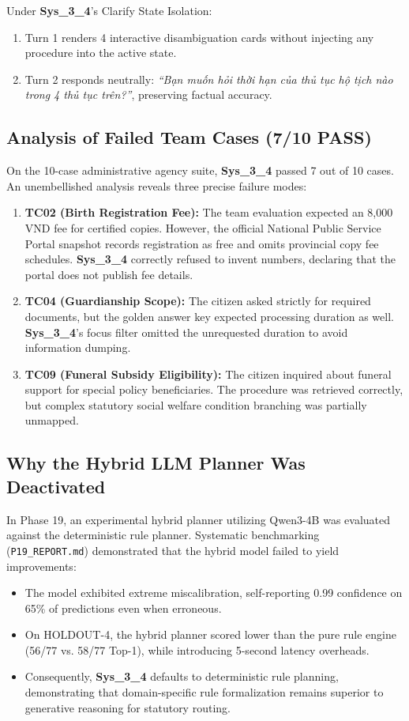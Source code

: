 \documentclass[11pt,a4paper]{article}
\begin{document}
Under \textbf{Sys\_3\_4}'s Clarify State Isolation:
\begin{enumerate}
    \item Turn 1 renders 4 interactive disambiguation cards without injecting any procedure into the active state.
    \item Turn 2 responds neutrally: \textit{``Bạn muốn hỏi thời hạn của thủ tục hộ tịch nào trong 4 thủ tục trên?''}, preserving factual accuracy.
\end{enumerate}

\subsection{Analysis of Failed Team Cases (7/10 PASS)}
On the 10-case administrative agency suite, \textbf{Sys\_3\_4} passed 7 out of 10 cases. An unembellished analysis reveals three precise failure modes:
\begin{enumerate}
    \item \textbf{TC02 (Birth Registration Fee):} The team evaluation expected an 8,000 VND fee for certified copies. However, the official National Public Service Portal snapshot records registration as free and omits provincial copy fee schedules. \textbf{Sys\_3\_4} correctly refused to invent numbers, declaring that the portal does not publish fee details.
    \item \textbf{TC04 (Guardianship Scope):} The citizen asked strictly for required documents, but the golden answer key expected processing duration as well. \textbf{Sys\_3\_4}'s focus filter omitted the unrequested duration to avoid information dumping.
    \item \textbf{TC09 (Funeral Subsidy Eligibility):} The citizen inquired about funeral support for special policy beneficiaries. The procedure was retrieved correctly, but complex statutory social welfare condition branching was partially unmapped.
\end{enumerate}

\subsection{Why the Hybrid LLM Planner Was Deactivated}
In Phase 19, an experimental hybrid planner utilizing Qwen3-4B was evaluated against the deterministic rule planner. Systematic benchmarking (\texttt{P19\_REPORT.md}) demonstrated that the hybrid model failed to yield improvements:
\begin{itemize}
    \item The model exhibited extreme miscalibration, self-reporting 0.99 confidence on 65\% of predictions even when erroneous.
    \item On HOLDOUT-4, the hybrid planner scored lower than the pure rule engine (56/77 vs. 58/77 Top-1), while introducing 5-second latency overheads.
    \item Consequently, \textbf{Sys\_3\_4} defaults to deterministic rule planning, demonstrating that domain-specific rule formalization remains superior to generative reasoning for statutory routing.
\end{itemize}
\end{document}

